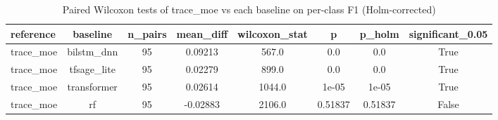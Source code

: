 \begin{table}[htbp]
\centering
\caption{Paired Wilcoxon tests of trace_moe vs each baseline on per-class F1 (Holm-corrected)}
\label{tab:wilcoxon_trace_moe_vs_baselines_official}
\begin{tabular}{lccccccc}
\toprule
reference & baseline & n\_pairs & mean\_diff & wilcoxon\_stat & p & p\_holm & significant\_0.05 \\
\midrule
trace\_moe & bilstm\_dnn & 95 & 0.09213 & 567.0 & 0.0 & 0.0 & True \\
trace\_moe & tfsage\_lite & 95 & 0.02279 & 899.0 & 0.0 & 0.0 & True \\
trace\_moe & transformer & 95 & 0.02614 & 1044.0 & 1e-05 & 1e-05 & True \\
trace\_moe & rf & 95 & -0.02883 & 2106.0 & 0.51837 & 0.51837 & False \\
\bottomrule
\end{tabular}
\end{table}